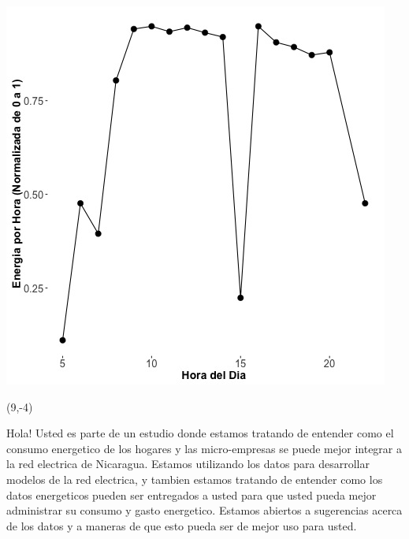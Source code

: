 \documentclass{article}\usepackage[]{graphicx}\usepackage[]{color}
\newenvironment{knitrout}{}{} %
\begin{document}
\begin{knitrout}
\color{fgcolor}
\includegraphics[scale=0.75]{figure/A6_fplot_norm_median} 
\end{knitrout}

 \begin{textblock}{1}(9,-4)
\begin{minipage}{20em}
\begingroup

\endgroup
\end{minipage}
\end{textblock}



\vspace{70px}
\begin{knitrout}
Hola! Usted es parte de un estudio donde estamos tratando de entender como el consumo energetico de los hogares y las micro-empresas se puede mejor integrar a la red electrica de Nicaragua. Estamos utilizando los datos para desarrollar modelos de la red electrica, y tambien estamos tratando de entender como los datos energeticos pueden ser entregados a usted para que usted pueda mejor administrar su consumo y gasto energetico.  Estamos abiertos a sugerencias acerca de los datos y a maneras de que esto pueda ser de mejor uso para usted.
\end{knitrout}
\end{document}
